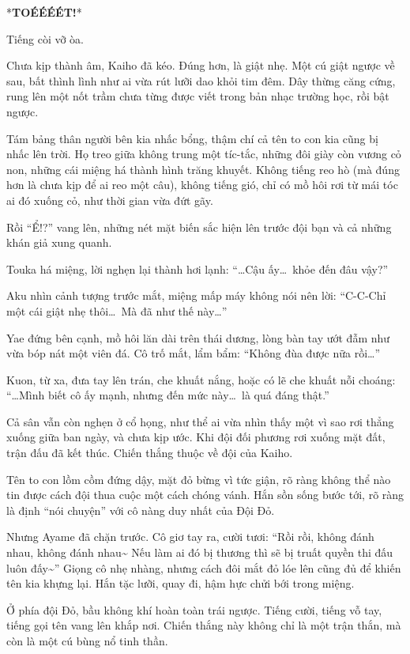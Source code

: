 \documentclass[../main.tex]{subfiles}
\begin{document}
*\textbf{TOÉÉÉÉT!}*

Tiếng còi vỡ òa.

Chưa kịp thành âm, Kaiho đã kéo. Đúng hơn, là giật nhẹ. Một cú giật ngược về sau, bất thình lình như ai vừa rút lưỡi dao khỏi tim đêm. Dây thừng căng cứng, rung lên một nốt trầm chưa từng được viết trong bản nhạc trường học, rồi bật ngược.

Tám bảng thân người bên kia nhấc bổng, thậm chí cả tên to con kia cũng bị nhấc lên trời. Họ treo giữa không trung một tíc-tắc, những đôi giày còn vương cỏ non, những cái miệng há thành hình trăng khuyết. Không tiếng reo hò (mà đúng hơn là chưa kịp để ai reo một câu), không tiếng gió, chỉ có mồ hôi rơi từ mái tóc ai đó xuống cỏ, như thời gian vừa đứt gãy.

Rồi ``Ể!?'' vang lên, những nét mặt biến sắc hiện lên trước đội bạn và cả những khán giả xung quanh.

Touka há miệng, lời nghẹn lại thành hơi lạnh:  ``\dots Cậu ấy\dots\ khỏe đến đâu vậy?''

Aku nhìn cảnh tượng trước mắt, miệng mấp máy không nói nên lời: ``C-C-Chỉ một cái giật nhẹ thôi\dots\ Mà đã như thế này\dots''

Yae đứng bên cạnh, mồ hôi lăn dài trên thái dương, lòng bàn tay ướt đẫm như vừa bóp nát một viên đá. Cô trố mắt, lẩm bẩm: ``Không đùa được nữa rồi\dots''

Kuon, từ xa, đưa tay lên trán, che khuất nắng, hoặc có lẽ che khuất nỗi choáng: ``\dots Mình biết cô ấy mạnh, nhưng đến mức này\dots\ là quá đáng thật.''

Cả sân vẫn còn nghẹn ở cổ họng, như thể ai vừa nhìn thấy một vì sao rơi thẳng xuống giữa ban ngày, và chưa kịp ước. Khi đội đối phương rơi xuống mặt đất, trận đấu đã kết thúc. Chiến thắng thuộc về đội của Kaiho.

Tên to con lồm cồm đứng dậy, mặt đỏ bừng vì tức giận, rõ ràng không thể nào tin được cách đội thua cuộc một cách chóng vánh. Hắn sồn sống bước tới, rõ ràng là định ``nói chuyện'' với cô nàng duy nhất của Đội Đỏ.

Nhưng Ayame đã chặn trước. Cô giơ tay ra, cười tươi: ``Rồi rồi, không đánh nhau, không đánh nhau\~{} Nếu làm ai đó bị thương thì sẽ bị truất quyền thi đấu luôn đấy\~{}'' Giọng cô nhẹ nhàng, nhưng cách đôi mắt đỏ lóe lên cũng đủ để khiến tên kia khựng lại. Hắn tặc lưỡi, quay đi, hậm hực chửi bới trong miệng.

Ở phía đội Đỏ, bầu không khí hoàn toàn trái ngược. Tiếng cười, tiếng vỗ tay, tiếng gọi tên vang lên khắp nơi. Chiến thắng này không chỉ là một trận thắn, mà còn là một cú bùng nổ tinh thần.
\end{document}

